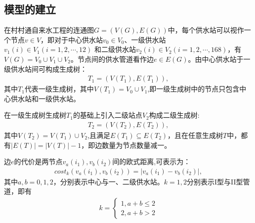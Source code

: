 \documentclass{whutmod}
\begin{document}
		\subsection{模型的建立}
		在村村通自来水工程的连通图$G=(V(G),E(G))$中，每个供水站可以视作一个节点$v \in V$，即对于中心供水站$v_0 \in V_0$、一级供水站$v_1(i) \in V_1 (i=1,2,\cdots,12)$ 和二级供水站$v_2(i) \in V_2 (i=1,2,\cdots,168)$，有$V(G)=V_0\cup  V_1\cup V_2$。节点间的供水管道看作边$e \in E(G)$。由中心供水站于一级供水站间可构成生成树：
		\begin{gather*}
		T_{1}=(V(T_{1}),E(T_{1})),
		\end{gather*}
		其中$T_{1}$代表一级生成树，其中$V(T_{1})=V_0\cup V_1$,即一级生成树中的节点只包含中心供水站和一级供水站。
		
		在一级生成树生成树$T_1$的基础上引入二级站点$V_2$构成二级生成树:
		\begin{gather*}	
		T_{2}=(V(T_{2}),E(T_{2})),
		\end{gather*}
		其中$V(T_{2})=V(T_{1})\cup V_2$,且满足$E(T_{1})\subseteq  E(T_{2})$，且在任意生成树$T$中，都有$|E(T)|=|V(T)|-1$，即边数量为节点数量减一。
		
		边$e$的代价是两节点$v_a(i_1), v_b(i_2)$间的欧式距离,可表示为：
		\begin{gather}
		cost_{k}(v_a(i_1),v_b(i_2))=\left | v_a(i_1)-v_b(i_2) \right |,
		\end{gather}
		其中$a,b=0,1,2$，分别表示中心与一、二级供水站。$k=1,2$分别表示I型与II型管道，即有
			\begin{gather}
			k=\left\{\begin{matrix}1,a+b\leqslant 2
			\\ 2,a+b>2
			\end{matrix}\right.
			\end{gather}
		
		
		
		
\end{document}
